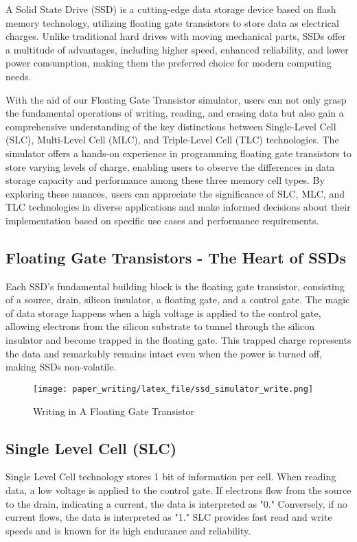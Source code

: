 \documentclass[conference]{paper_writing/latex_file/IEEEtran}
\begin{document}
A Solid State Drive (SSD) is a cutting-edge data storage device based on flash memory technology, utilizing floating gate transistors to store data as electrical charges. Unlike traditional hard drives with moving mechanical parts, SSDs offer a multitude of advantages, including higher speed, enhanced reliability, and lower power consumption, making them the preferred choice for modern computing needs.

With the aid of our Floating Gate Transistor simulator, users can not only grasp the fundamental operations of writing, reading, and erasing data but also gain a comprehensive understanding of the key distinctions between Single-Level Cell (SLC), Multi-Level Cell (MLC), and Triple-Level Cell (TLC) technologies. The simulator offers a hands-on experience in programming floating gate transistors to store varying levels of charge, enabling users to observe the differences in data storage capacity and performance among these three memory cell types. By exploring these nuances, users can appreciate the significance of SLC, MLC, and TLC technologies in diverse applications and make informed decisions about their implementation based on specific use cases and performance requirements.

\subsection{Floating Gate Transistors - The Heart of SSDs}
Each SSD's fundamental building block is the floating gate transistor, consisting of a source, drain, silicon insulator, a floating gate, and a control gate. The magic of data storage happens when a high voltage is applied to the control gate, allowing electrons from the silicon substrate to tunnel through the silicon insulator and become trapped in the floating gate. This trapped charge represents the data and remarkably remains intact even when the power is turned off, making SSDs non-volatile.
\begin{figure}[h]
    \centering
    \texttt{[image: paper\_writing/latex\_file/ssd\_simulator\_write.png]}
    \caption{Writing in A Floating Gate Transistor}
    \label{fig:ssd_simulator_write}
\end{figure}
\subsection{Single Level Cell (SLC)}
Single Level Cell technology stores 1 bit of information per cell. When reading data, a low voltage is applied to the control gate. If electrons flow from the source to the drain, indicating a current, the data is interpreted as "0." Conversely, if no current flows, the data is interpreted as "1." SLC provides fast read and write speeds and is known for its high endurance and reliability.
\end{document}
